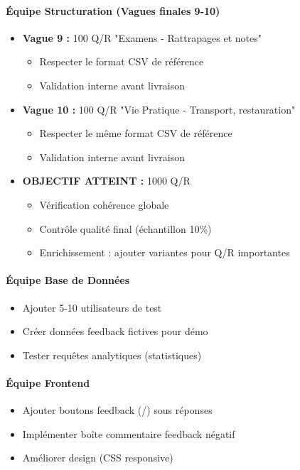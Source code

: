 \documentclass[11pt,a4paper]{article}
\begin{document}
\paragraph{Équipe Structuration (Vagues finales 9-10)}
\begin{itemize}
    \item[$\square$] \textbf{Vague 9 :} 100 Q/R "Examens - Rattrapages et notes"
    \begin{itemize}
        \item Respecter le format CSV de référence
        \item Validation interne avant livraison
    \end{itemize}

    \item[$\square$] \textbf{Vague 10 :} 100 Q/R "Vie Pratique - Transport, restauration"
    \begin{itemize}
        \item Respecter le même format CSV de référence
        \item Validation interne avant livraison
    \end{itemize}

    \item[$\square$] \textbf{OBJECTIF ATTEINT :} 1000 Q/R
    \begin{itemize}
        \item Vérification cohérence globale
        \item Contrôle qualité final (échantillon 10\%)
        \item Enrichissement : ajouter variantes pour Q/R importantes
    \end{itemize}
\end{itemize}


\paragraph{Équipe Base de Données}
\begin{itemize}
    \item[$\square$] Ajouter 5-10 utilisateurs de test
    \item[$\square$] Créer données feedback fictives pour démo
    \item[$\square$] Tester requêtes analytiques (statistiques)
\end{itemize}

\paragraph{Équipe Frontend}
\begin{itemize}
    \item[$\square$] Ajouter boutons feedback (\faThumbsUp/\faThumbsDown) sous réponses
    \item[$\square$] Implémenter boîte commentaire feedback négatif
    \item[$\square$] Améliorer design (CSS responsive)
\end{itemize}
\end{document}
